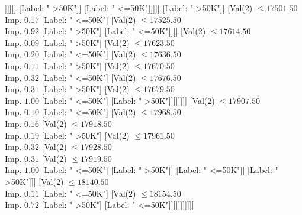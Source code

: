\documentclass[margin=10pt]{standalone}
\begin{document}
\begin{forest}
																														[Label: " >50K"]
																														[Label: " <=50K"]]]]]]
																									[Label: " >50K"]]
																								[Label: " <=50K"]]]]]
																				[Label: " >50K"]]
																			[Val($2$) $ \leq 17501.50$ \\ Imp. $0.17$
																				[Label: " <=50K"]
																				[Val($2$) $ \leq 17525.50$ \\ Imp. $0.92$
																					[Label: " >50K"]
																					[Label: " <=50K"]]]]
																		[Val($2$) $ \leq 17614.50$ \\ Imp. $0.09$
																			[Label: " >50K"]
																			[Val($2$) $ \leq 17623.50$ \\ Imp. $0.20$
																				[Label: " <=50K"]
																				[Val($2$) $ \leq 17636.50$ \\ Imp. $0.11$
																					[Label: " >50K"]
																					[Val($2$) $ \leq 17670.50$ \\ Imp. $0.32$
																						[Label: " <=50K"]
																						[Val($2$) $ \leq 17676.50$ \\ Imp. $0.31$
																							[Label: " >50K"]
																							[Val($2$) $ \leq 17679.50$ \\ Imp. $1.00$
																								[Label: " <=50K"]
																								[Label: " >50K"]]]]]]]]
																	[Val($2$) $ \leq 17907.50$ \\ Imp. $0.10$
																		[Label: " <=50K"]
																		[Val($2$) $ \leq 17968.50$ \\ Imp. $0.16$
																			[Val($2$) $ \leq 17918.50$ \\ Imp. $0.19$
																				[Label: " >50K"]
																				[Val($2$) $ \leq 17961.50$ \\ Imp. $0.32$
																					[Val($2$) $ \leq 17928.50$ \\ Imp. $0.31$
																						[Val($2$) $ \leq 17919.50$ \\ Imp. $1.00$
																							[Label: " <=50K"]
																							[Label: " >50K"]]
																						[Label: " <=50K"]]
																					[Label: " >50K"]]]
																			[Val($2$) $ \leq 18140.50$ \\ Imp. $0.11$
																				[Label: " <=50K"]
																				[Val($2$) $ \leq 18154.50$ \\ Imp. $0.72$
																					[Label: " >50K"]
																					[Label: " <=50K"]]]]]]]]]]]

\end{forest}
\end{document}
